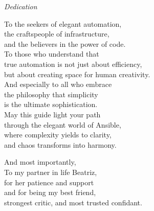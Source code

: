 \cleardoublepage  %
\thispagestyle{empty}  %

\begin{center}
{\Large\textit{Dedication}}\\[3cm]

\begin{em}
To the seekers of elegant automation,\\
the craftspeople of infrastructure,\\
and the believers in the power of code.\\[2em]

To those who understand that\\
true automation is not just about efficiency,\\
but about creating space for human creativity.\\[2em]

And especially to all who embrace\\
the philosophy that simplicity\\
is the ultimate sophistication.\\[2em]

May this guide light your path\\
through the elegant world of Ansible,\\
where complexity yields to clarity,\\
and chaos transforms into harmony.\\[3em]

\vspace{1cm}  %

{\small
And most importantly,\\
To my partner in life Beatriz,\\
for her patience and support\\
and for being my best friend,\\
strongest critic, and most trusted confidant.}
\end{em}
\end{center}

\clearpage